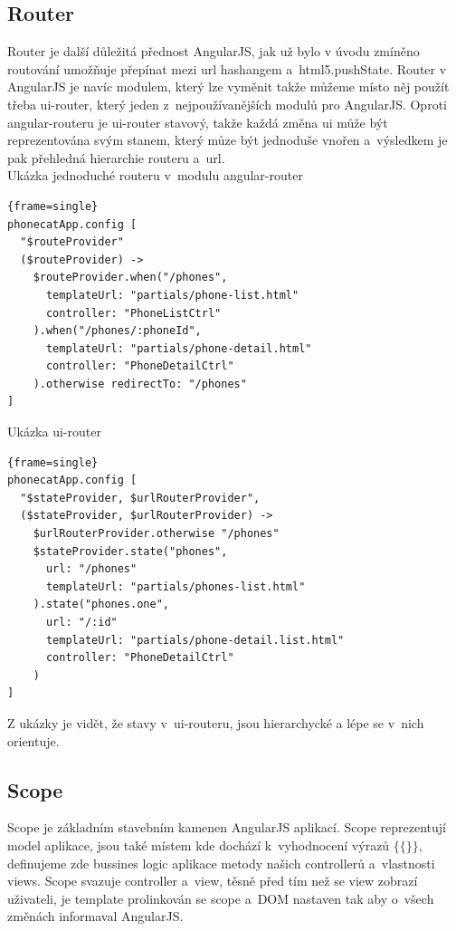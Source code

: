\documentclass[a4paper,12pt,twoside,BCOR=10mm]{article}
\newenvironment{codeframe}{%
  \begin{Sbox} 
    \begin{minipage} 
      {\columnwidth-\leftmargin-\rightmargin-2\fboxsep-2\fboxrule-4pt} 
}{%

  \end{minipage} 
  \end{Sbox} 
  \begin{center} 
    \fcolorbox{black}{codeback}{\TheSbox} 
  \end{center} 
}
\begin{document}
\subsection{Router}
Router je další důležitá přednost AngularJS, jak už bylo v úvodu zmíněno routování umožňuje přepínat mezi url hashangem a~html5.pushState. Router v AngularJS je navíc modulem, který lze vyměnit takže můžeme místo něj použít třeba ui-router, který jeden z~nejpoužívanějších modulů pro AngularJS. Oproti angular-routeru je ui-router stavový, takže každá změna ui může být reprezentována svým stanem, který můze být jednoduše vnořen a~výsledkem je pak přehledná hierarchie routeru a~url.\\

Ukázka jednoduché routeru v~modulu angular-router
     \begin{codeframe} 
      \begin{Verbatim}{frame=single}
phonecatApp.config [
  "$routeProvider"
  ($routeProvider) ->
    $routeProvider.when("/phones",
      templateUrl: "partials/phone-list.html"
      controller: "PhoneListCtrl"
    ).when("/phones/:phoneId",
      templateUrl: "partials/phone-detail.html"
      controller: "PhoneDetailCtrl"
    ).otherwise redirectTo: "/phones"
]
\end{Verbatim} 
    \end{codeframe}

Ukázka ui-router
     \begin{codeframe} 
      \begin{Verbatim}{frame=single}
phonecatApp.config [
  "$stateProvider, $urlRouterProvider",
  ($stateProvider, $urlRouterProvider) ->
    $urlRouterProvider.otherwise "/phones"
    $stateProvider.state("phones",
      url: "/phones"
      templateUrl: "partials/phones-list.html"
    ).state("phones.one",
      url: "/:id"
      templateUrl: "partials/phone-detail.list.html"
      controller: "PhoneDetailCtrl"
    )
]
\end{Verbatim} 
    \end{codeframe}
Z ukázky je vidět, že stavy v~ui-routeru, jsou hierarchycké a lépe se v~nich orientuje.\\

\subsection{Scope}
Scope je základním stavebním kamenen AngularJS aplikací. Scope reprezentují model aplikace, jsou také místem kde dochází k~vyhodnocení výrazů $\{\{ \}\}$, definujeme zde bussines logic aplikace metody našich controllerů a~vlastnosti views. Scope svazuje controller a~view, těsně před tím než se view zobrazí uživateli, je template prolinkován se scope a~DOM nastaven tak aby o~všech změnách informaval AngularJS.\cite{ngBOOK}\\
\end{document}

